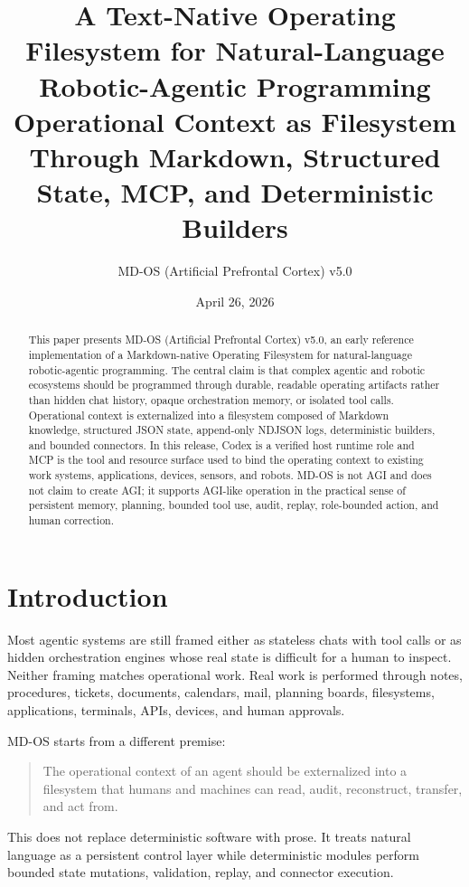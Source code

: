\documentclass[11pt,a4paper]{article}
\title{\textbf{A Text-Native Operating Filesystem for Natural-Language Robotic-Agentic Programming}\\
\large Operational Context as Filesystem Through Markdown, Structured State, MCP, and Deterministic Builders}
\author{MD-OS (Artificial Prefrontal Cortex) v5.0}
\date{April 26, 2026}
\begin{document}
\maketitle

\begin{abstract}
This paper presents MD-OS (Artificial Prefrontal Cortex) v5.0, an early reference implementation of a
Markdown-native Operating Filesystem for natural-language robotic-agentic
programming. The central claim is that complex agentic and robotic ecosystems
should be programmed through durable, readable operating artifacts rather than
hidden chat history, opaque orchestration memory, or isolated tool calls.
Operational context is externalized into a filesystem composed of Markdown
knowledge, structured JSON state, append-only NDJSON logs, deterministic
builders, and bounded connectors. In this release, Codex is a verified
host runtime role and MCP is the tool and resource surface used to bind
the operating context to existing work systems, applications, devices, sensors,
and robots. MD-OS is not AGI and does not claim to create AGI; it supports
AGI-like operation in the practical sense of persistent memory, planning,
bounded tool use, audit, replay, role-bounded action, and human correction.
\end{abstract}

\section{Introduction}

Most agentic systems are still framed either as stateless chats with tool calls
or as hidden orchestration engines whose real state is difficult for a human to
inspect. Neither framing matches operational work. Real work is performed
through notes, procedures, tickets, documents, calendars, mail, planning boards,
filesystems, applications, terminals, APIs, devices, and human approvals.

MD-OS starts from a different premise:

\begin{quote}
The operational context of an agent should be externalized into a filesystem
that humans and machines can read, audit, reconstruct, transfer, and act from.
\end{quote}

This does not replace deterministic software with prose. It treats natural
language as a persistent control layer while deterministic modules perform
bounded state mutations, validation, replay, and connector execution.
\end{document}

